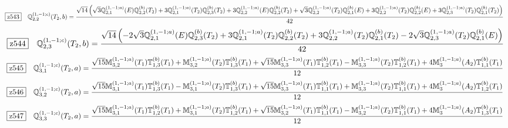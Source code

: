 \documentclass[fleqn,10pt,landscape]{jsarticle}
\begin{document}
\begin{dmath*}
\hspace*{3mm}\fbox{z543}\quad \mathbb{Q}_{2,2}^{(1,-1;c)}(T_{2},b)=\frac{\sqrt{14} \left(\sqrt{3} \mathbb{Q}_{2,1}^{(1,-1;a)}(E) \mathbb{Q}_{2,2}^{(b)}(T_{2}) + 3 \mathbb{Q}_{2,1}^{(1,-1;a)}(T_{2}) \mathbb{Q}_{2,3}^{(b)}(T_{2}) + 3 \mathbb{Q}_{2,2}^{(1,-1;a)}(E) \mathbb{Q}_{2,2}^{(b)}(T_{2}) + \sqrt{3} \mathbb{Q}_{2,2}^{(1,-1;a)}(T_{2}) \mathbb{Q}_{2,1}^{(b)}(E) + 3 \mathbb{Q}_{2,2}^{(1,-1;a)}(T_{2}) \mathbb{Q}_{2,2}^{(b)}(E) + 3 \mathbb{Q}_{2,3}^{(1,-1;a)}(T_{2}) \mathbb{Q}_{2,1}^{(b)}(T_{2})\right)}{42}
\end{dmath*}
\begin{dmath*}
\hspace*{3mm}\fbox{z544}\quad \mathbb{Q}_{2,3}^{(1,-1;c)}(T_{2},b)=\frac{\sqrt{14} \left(- 2 \sqrt{3} \mathbb{Q}_{2,1}^{(1,-1;a)}(E) \mathbb{Q}_{2,3}^{(b)}(T_{2}) + 3 \mathbb{Q}_{2,1}^{(1,-1;a)}(T_{2}) \mathbb{Q}_{2,2}^{(b)}(T_{2}) + 3 \mathbb{Q}_{2,2}^{(1,-1;a)}(T_{2}) \mathbb{Q}_{2,1}^{(b)}(T_{2}) - 2 \sqrt{3} \mathbb{Q}_{2,3}^{(1,-1;a)}(T_{2}) \mathbb{Q}_{2,1}^{(b)}(E)\right)}{42}
\end{dmath*}
\begin{dmath*}
\hspace*{3mm}\fbox{z545}\quad \mathbb{Q}_{3,1}^{(1,-1;c)}(T_{2},a)=\frac{\sqrt{15} \mathbb{M}_{3,2}^{(1,-1;a)}(T_{1}) \mathbb{T}_{1,3}^{(b)}(T_{1}) + \mathbb{M}_{3,2}^{(1,-1;a)}(T_{2}) \mathbb{T}_{1,3}^{(b)}(T_{1}) + \sqrt{15} \mathbb{M}_{3,3}^{(1,-1;a)}(T_{1}) \mathbb{T}_{1,2}^{(b)}(T_{1}) - \mathbb{M}_{3,3}^{(1,-1;a)}(T_{2}) \mathbb{T}_{1,2}^{(b)}(T_{1}) + 4 \mathbb{M}_{3}^{(1,-1;a)}(A_{2}) \mathbb{T}_{1,1}^{(b)}(T_{1})}{12}
\end{dmath*}
\begin{dmath*}
\hspace*{3mm}\fbox{z546}\quad \mathbb{Q}_{3,2}^{(1,-1;c)}(T_{2},a)=\frac{\sqrt{15} \mathbb{M}_{3,1}^{(1,-1;a)}(T_{1}) \mathbb{T}_{1,3}^{(b)}(T_{1}) - \mathbb{M}_{3,1}^{(1,-1;a)}(T_{2}) \mathbb{T}_{1,3}^{(b)}(T_{1}) + \sqrt{15} \mathbb{M}_{3,3}^{(1,-1;a)}(T_{1}) \mathbb{T}_{1,1}^{(b)}(T_{1}) + \mathbb{M}_{3,3}^{(1,-1;a)}(T_{2}) \mathbb{T}_{1,1}^{(b)}(T_{1}) + 4 \mathbb{M}_{3}^{(1,-1;a)}(A_{2}) \mathbb{T}_{1,2}^{(b)}(T_{1})}{12}
\end{dmath*}
\begin{dmath*}
\hspace*{3mm}\fbox{z547}\quad \mathbb{Q}_{3,3}^{(1,-1;c)}(T_{2},a)=\frac{\sqrt{15} \mathbb{M}_{3,1}^{(1,-1;a)}(T_{1}) \mathbb{T}_{1,2}^{(b)}(T_{1}) + \mathbb{M}_{3,1}^{(1,-1;a)}(T_{2}) \mathbb{T}_{1,2}^{(b)}(T_{1}) + \sqrt{15} \mathbb{M}_{3,2}^{(1,-1;a)}(T_{1}) \mathbb{T}_{1,1}^{(b)}(T_{1}) - \mathbb{M}_{3,2}^{(1,-1;a)}(T_{2}) \mathbb{T}_{1,1}^{(b)}(T_{1}) + 4 \mathbb{M}_{3}^{(1,-1;a)}(A_{2}) \mathbb{T}_{1,3}^{(b)}(T_{1})}{12}
\end{dmath*}
\end{document}
